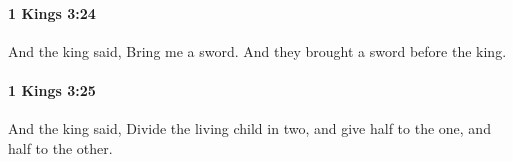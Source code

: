 		\paragraph{1 Kings 3:24} %
			\label{1KINGS-3-24}

			And the king said, Bring me a sword. And they brought a sword before the king.


		\paragraph{1 Kings 3:25} %
			\label{1KINGS-3-25}

			And the king said, Divide the living child in two, and give half to the one, and half to the other.


